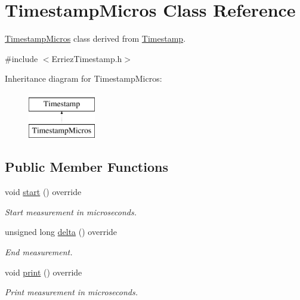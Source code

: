 \hypertarget{class_timestamp_micros}{}\section{Timestamp\+Micros Class Reference}
\label{class_timestamp_micros}


\hyperlink{class_timestamp_micros}{Timestamp\+Micros} class derived from \hyperlink{class_timestamp}{Timestamp}.  




{\ttfamily \#include $<$Erriez\+Timestamp.\+h$>$}

Inheritance diagram for Timestamp\+Micros\+:\begin{figure}[H]
\begin{center}
\leavevmode
\includegraphics[height=2.000000cm]{class_timestamp_micros}
\end{center}
\end{figure}
\subsection*{Public Member Functions}
\begin{DoxyCompactItemize}
\item 
void \hyperlink{class_timestamp_micros_a847c7bc584b217cc901b22c1e08b013e}{start} () override\hypertarget{class_timestamp_micros_a847c7bc584b217cc901b22c1e08b013e}{}\label{class_timestamp_micros_a847c7bc584b217cc901b22c1e08b013e}

\begin{DoxyCompactList}\small\item\em Start measurement in microseconds. \end{DoxyCompactList}\item 
unsigned long \hyperlink{class_timestamp_micros_ae0489e7ea01e5a726b23ee3243868e92}{delta} () override
\begin{DoxyCompactList}\small\item\em End measurement. \end{DoxyCompactList}\item 
void \hyperlink{class_timestamp_micros_afb2a63d2cd3d42b66186462c2e79b5d1}{print} () override
\begin{DoxyCompactList}\small\item\em Print measurement in microseconds. \end{DoxyCompactList}\end{DoxyCompactItemize}


